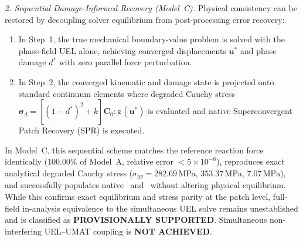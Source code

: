 \textit{2. Sequential Damage-Informed Recovery (Model~C).}
Physical consistency can be restored by decoupling solver equilibrium from post-processing error recovery:
\begin{enumerate}
  \item In Step~1, the true mechanical boundary-value problem is solved with the phase-field UEL alone, achieving converged displacements $\mathbf{u}^*$ and phase damage $d^*$ with zero parallel force perturbation.
  \item In Step~2, the converged kinematic and damage state is projected onto standard continuum elements where degraded Cauchy stress $\boldsymbol{\sigma}_d = [(1-d^*)^2 + k] \mathbf{C}_0 : \boldsymbol{\varepsilon}(\mathbf{u}^*)$ is evaluated and native Superconvergent Patch Recovery (SPR) is executed.
\end{enumerate}
In Model~C, this sequential scheme matches the reference reaction force identically ($100.00\%$ of Model~A, relative error $< 5 \times 10^{-8}$), reproduces exact analytical degraded Cauchy stress ($\sigma_{yy} = 282.69\,\mathrm{MPa}$, $353.37\,\mathrm{MPa}$, $7.07\,\mathrm{MPa}$), and successfully populates native \MISESERI\ and \MISESAVG\ without altering physical equilibrium. While this confirms exact equilibrium and stress parity at the patch level, full-field in-analysis equivalence to the simultaneous UEL solve remains unestablished and is classified as \textbf{PROVISIONALLY SUPPORTED}. Simultaneous non-interfering UEL--UMAT coupling is \textbf{NOT ACHIEVED}.

